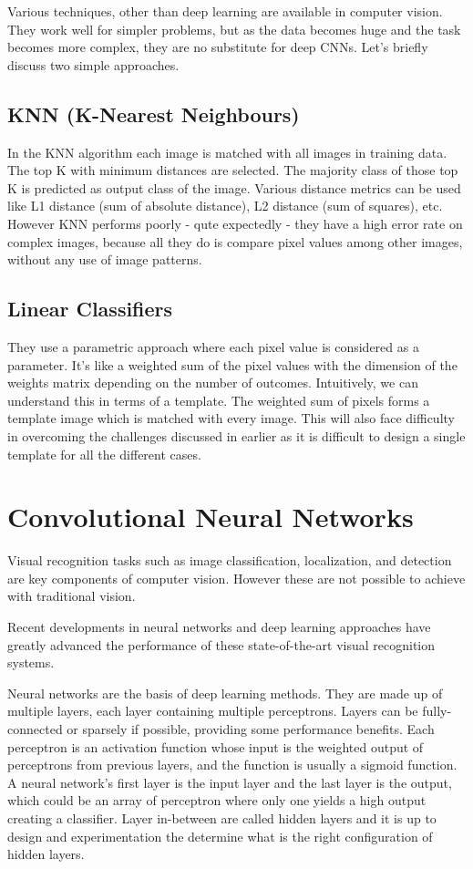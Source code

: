 Various techniques, other than deep learning are available in computer vision.
They work well for simpler problems, but as the data becomes huge and the task
becomes more complex, they are no substitute for deep CNNs. Let’s briefly
discuss two simple approaches.

\subsection{KNN (K-Nearest Neighbours)}

In the KNN algorithm each image is matched with all images in training data. The
top K with minimum distances are selected. The majority class of those top K is
predicted as output class of the image. Various distance metrics can be used
like L1 distance (sum of absolute distance), L2 distance (sum of squares), etc.
However KNN performs poorly - qute expectedly - they have a high error rate on
complex images, because all they do is compare pixel values among other images,
without any use of image patterns.

\subsection{Linear Classifiers}

They use a parametric approach where each pixel value is considered as a
parameter. It’s like a weighted sum of the pixel values with the dimension of
the weights matrix depending on the number of outcomes. Intuitively, we can
understand this in terms of a template. The weighted sum of pixels forms a
template image which is matched with every image. This will also face difficulty
in overcoming the challenges discussed in earlier as it is difficult to design a
single template for all the different cases.

\section{Convolutional Neural Networks}

Visual recognition tasks such as image classification, localization, and
detection are key components of computer vision. However these are not possible
to achieve with traditional vision.

Recent developments in neural networks and deep learning approaches have greatly
advanced the performance of these state-of-the-art visual recognition systems.

Neural networks are the basis of deep learning methods. They are made up of
multiple layers, each layer containing multiple perceptrons. Layers can be
fully-connected or sparsely if possible, providing some performance benefits.
Each perceptron is an activation function whose input is the weighted output of
perceptrons from previous layers, and the function is usually a sigmoid
function. A neural network's first layer is the input layer and the last layer is
the output, which could be an array of perceptron where only one yields a high
output creating a classifier. Layer in-between are called hidden layers and it
is up to design and experimentation the determine what is the right
configuration of hidden layers.


